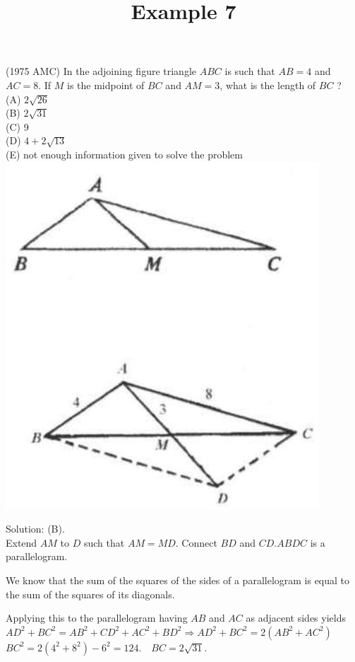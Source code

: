 \documentclass{article}
\title{Example 7}
\date{}
\begin{document}
\maketitle

(1975 AMC) In the adjoining figure triangle \(A B C\) is such that \(A B=4\) and \(A C=8\). If \(M\) is the midpoint of \(B C\) and \(A M=3\), what is the length of \(B C\) ?\\
(A) \(2 \sqrt{26}\)\\
(B) \(2 \sqrt{31}\)\\
(C) 9\\
(D) \(4+2 \sqrt{13}\)\\
(E) not enough information given to solve the problem\\
\centering
\includegraphics[width=\textwidth]{images/026(2).jpg}

Solution: (B).\\
Extend \(A M\) to \(D\) such that \(A M=M D\). Connect \(B D\) and \(C D . A B D C\) is a parallelogram.

We know that the sum of the squares of the sides of a parallelogram is equal to the sum of the squares of its diagonals.

Applying this to the parallelogram having \(A B\) and \(A C\) as adjacent sides yields\\
\(A D^{2}+B C^{2}=A B^{2}+C D^{2}+A C^{2}+B D^{2} \Rightarrow A D^{2}+B C^{2}=2\left(A B^{2}+A C^{2}\right)\)\\
\(B C^{2}=2\left(4^{2}+8^{2}\right)-6^{2}=124 . \quad B C=2 \sqrt{31}\).
\end{document}
